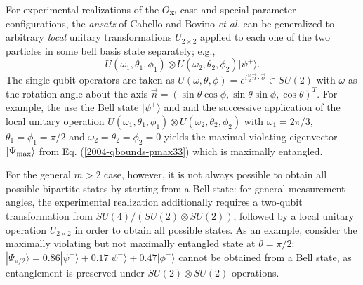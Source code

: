 \documentclass[prl,showpacs,showkeys,amsfonts,amsmath,twocolumn]{revtex4}
\newcommand{\ket}[1]{|#1\rangle}
\begin{document}
For experimental realizations of the $O_{33}$ case and special parameter configurations,
the {\it ansatz} of Cabello \cite{cabello-2003a} and Bovino {\it et al.} \cite{bovino-2003}
can be generalized to arbitrary {\em local}
unitary transformations $U_{2\times 2}$ applied to each one of the two particles
in some bell basis state
separately; e.g.,
\begin{equation}
  U(\omega_1,\theta_1,\phi_1)\otimes U(\omega_2,\theta_2,\phi_2) \ket{\psi^+} .
\label{2004-qbounds-gencab}
\end{equation}
The single
qubit operators are taken as $U(\omega,\theta,\phi) =
e^{i\frac{\omega}{2} \vec{n}\cdot\vec{\sigma}} \in SU(2)$ with
$\omega$ as the rotation angle about the axis $\vec{n}=
(\sin\theta\cos\phi,\sin\theta\sin\phi,\cos\theta)^T$.
For example, the use the Bell state
$\ket{\psi^+} $ and
and the successive application of the local unitary operation $U(\omega_1,\theta_1,\phi_1)\otimes
U(\omega_2,\theta_2,\phi_2)$ with $\omega_1 =2\pi/3$,
$\theta_1=\phi_1=\pi/2$ and $\omega_2=\theta_2=\phi_2=0$ yields the  maximal violating eigenvector
$\ket{\Psi_{\rm max}}$ from
Eq. (\ref{2004-qbounds-pmax33}) which is maximally entangled.

For the general $m>2$ case,  however,
it is not always possible to obtain all possible bipartite states by starting from a Bell state:
for general measurement angles, the experimental realization additionally requires a two-qubit
transformation from
$SU(4)/(SU(2)\otimes SU(2))$, followed by a local
unitary operation $U_{2\times 2}$ in order to obtain all possible states.
As an example, consider the maximally violating but not maximally entangled state at $\theta=\pi/2$:
$\ket{\Psi_{\pi/2}} = 0.86
  \ket{\psi^+} + 0.17\ket{\psi^-} + 0.47\ket{\phi^-}$ cannot be
  obtained from a Bell state, as
  entanglement is preserved under $SU(2) \otimes SU(2)$ operations.
\end{document}
